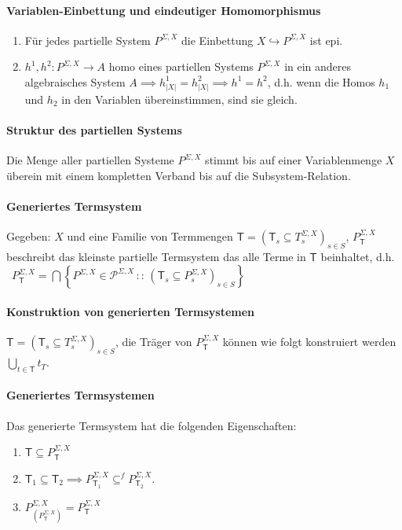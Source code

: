 \paragraph{ Variablen-Einbettung und eindeutiger Homomorphismus}  
\begin{enumerate}
\item Für jedes partielle System $P^{\Sigma,X}$ die Einbettung $X\hookrightarrow P^{\Sigma,X}$ ist epi.
\item $h^1, h^2: P^{\Sigma,X} \rightarrow A$ homo eines partiellen Systems $P^{\Sigma,X}$ in ein anderes algebraisches System $A \implies h_{|X|}^1 = h_{|X|}^2 \implies h^1 = h^2$, d.h. wenn die Homos $h_1$ und $h_2$ in den Variablen übereinstimmen, sind sie gleich.  
\end{enumerate}

\paragraph{ Struktur des partiellen Systems}
Die Menge aller partiellen Systeme $P^{\Sigma,X}$ stimmt bis auf einer Variablenmenge $X$ überein mit einem kompletten Verband bis auf die Subsystem-Relation.

\paragraph{ Generiertes Termsystem}
Gegeben: $X$ und eine Familie von Termmengen $\mathsf{T}=\left(\mathsf{T}_{s}\subseteq T_{s}^{\Sigma,X}\right)_{s\in S}$,
$P_{\mathsf{T}}^{\Sigma,X}$ beschreibt das kleinste partielle Termsystem
das alle Terme in  $\mathsf{T}$ beinhaltet, d.h. ~$P_{\mathsf{T}}^{\Sigma,X}=\bigcap\left\{ P^{\Sigma,X}\in\mathcal{P}^{\Sigma,X}\,::\,\left(\mathsf{T}_{s}\subseteq P_{s}^{\Sigma,X}\right)_{s\in S}\right\} $

\paragraph{ Konstruktion von generierten Termsystemen}
$\mathsf{T}=\left(\mathsf{T}_{s}\subseteq T_{s}^{\Sigma,X}\right)_{s\in S}$,
die Träger von $P_{\mathsf{T}}^{\Sigma,X}$ können wie folgt konstruiert werden
$\underset{t\in\mathsf{T}}{\bigcup}t_{T}$.


\paragraph{ Generiertes Termsystemen}
Das generierte Termsystem hat die folgenden Eigenschaften: 
\begin{enumerate}
\item $\mathsf{T}\subseteq P_{\mathsf{T}}^{\Sigma,X}$
\item $\mathsf{T}_{1}\subseteq\mathsf{T}_{2}\implies P_{\mathsf{T}_{1}}^{\Sigma,X}\subseteq^{f}P_{\mathsf{T}_{2}}^{\Sigma,X}$.
\item $P_{\left(P_{\mathsf{T}}^{\Sigma,X}\right)}^{\Sigma,X}=P_{\mathsf{T}}^{\Sigma,X}$
\end{enumerate}

